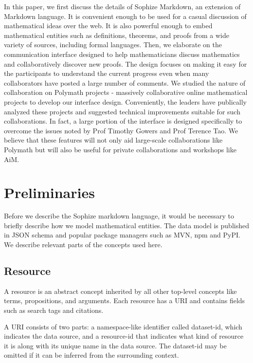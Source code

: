 \documentclass[a4paper]{article}
\begin{document}
In this paper, we first discuss the details of Sophize Markdown, an extension of Markdown language. It is convenient enough to be used for a casual discussion of mathematical ideas over the web. It is also powerful enough to embed mathematical entities such as definitions, theorems, and proofs from a wide variety of sources, including formal languages. Then, we elaborate on the communication interface designed to help mathematicians discuss mathematics and collaboratively discover new proofs. The design focuses on making it easy for the participants to understand the current progress even when many collaborators have posted a large number of comments. We studied the nature of collaboration on Polymath projects - massively collaborative online mathematical projects to develop our interface design. Conveniently, the leaders have publically analyzed these projects and suggested technical improvements suitable for such collaborations. In fact, a large portion of the interface is designed specifically to overcome the issues noted by Prof Timothy Gowers \cite{gowers_weblog_2009} and Prof Terence Tao\cite{whats_new_2009}. We believe that these features will not only aid large-scale collaborations like Polymath but will also be useful for private collaborations and workshops like AiM.



\section{Preliminaries}


Before we describe the Sophize markdown language, it would be necessary to briefly describe how we model mathematical entities. The data model is published in JSON schema\cite{sophize_datamodel} and popular package managers such as MVN, npm and PyPI. We describe relevant parts of the concepts used here.


\subsection*{Resource}

A resource is an abstract concept inherited by all other top-level concepts like terms, propositions, and arguments. Each resource has a URI and contains fields such as search tags and citations.


A URI consists of two parts: a namespace-like identifier called dataset-id, which indicates the data source, and a resource-id that indicates what kind of resource it is along with its unique name in the data source. The dataset-id may be omitted if it can be inferred from the surrounding context.
\end{document}
